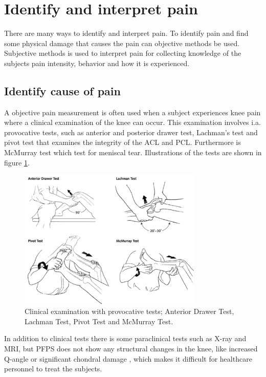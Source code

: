 \section{Identify and interpret pain}
There are many ways to identify and interpret pain. To identify pain and find some physical damage that causes the pain can objective methods be used. Subjective methods is used to interpret pain for collecting knowledge of the subjects pain intensity, behavior and how it is experienced.\citep{Younger2009}

\subsection{Identify cause of pain}
A objective pain measurement is often used when a subject experiences knee pain where a clinical examination of the knee can occur. This examination involves i.a. provocative tests, such as anterior and posterior drawer test, Lachman’s test and pivot test that examines the integrity of the ACL and PCL. Furthermore is McMurray test which test for meniscal tear.\citep{Ghosh2010} Illustrations of the tests are shown in figure \ref{fig:kneetest}.

\begin{figure} [H]
\centering
\includegraphics[width=0.78\textwidth]{figures/kneetest}
\caption{Clinical examination with provocative tests; Anterior Drawer Test, Lachman Test, Pivot Test and McMurray Test.\citep{Ghosh2010}}
\label{fig:kneetest}
\end{figure}


\noindent
In addition to clinical tests there is some paraclinical tests such as X-ray and MRI, but PFPS does not show any structural changes in the knee, like increased Q-angle or significant chondral damage \citep{Petersen2013}, which makes it difficult for healthcare personnel to treat the subjects. 


